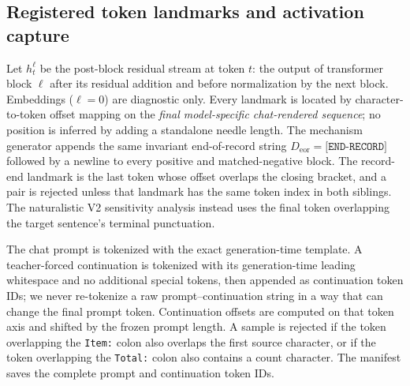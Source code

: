 \documentclass[10pt,twocolumn]{article}
\begin{document}
\subsection{Registered token landmarks and activation capture}
Let $h_t^\ell$ be the post-block residual stream at token $t$: the output of transformer block
$\ell$ after its residual addition and before normalization by the next block. Embeddings
($\ell=0$) are diagnostic only. Every landmark is located by character-to-token offset mapping
on the \emph{final model-specific chat-rendered sequence}; no position is inferred by adding a
standalone needle length. The mechanism generator appends the same invariant end-of-record string
$D_{\mathrm{eor}}=\texttt{[END-RECORD]}$ followed by a newline to every positive and
matched-negative block. The record-end landmark is the last token whose offset overlaps the
closing bracket, and a pair is rejected unless that landmark has the same token index in both
siblings. The naturalistic V2 sensitivity analysis instead uses the final token overlapping the
target sentence's terminal punctuation.

The chat prompt is tokenized with the exact generation-time template. A teacher-forced
continuation is tokenized with its generation-time leading whitespace and no additional special
tokens, then appended as continuation token IDs; we never re-tokenize a raw prompt--continuation
string in a way that can change the final prompt token. Continuation offsets are computed on
that token axis and shifted by the frozen prompt length. A sample is rejected if the token
overlapping the \texttt{Item:} colon also overlaps the first source character, or if the token
overlapping the \texttt{Total:} colon also contains a count character. The manifest saves the
complete prompt and continuation token IDs.
\end{document}

